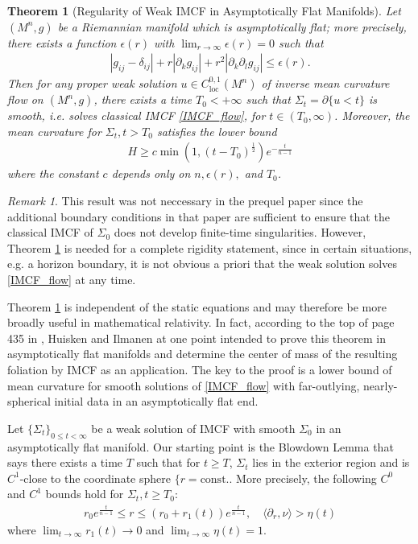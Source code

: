 \documentclass[12pt,twoside]{article}
\theoremstyle{plain}
\newtheorem{theorem}{Theorem}[section]
\theoremstyle{definition}
\theoremstyle{remark}
\newtheorem*{remark}{Remark}
\newcommand{\pl}{\partial}
\newcommand{\rw}{\rightarrow}
\numberwithin{equation}{section}
\begin{document}
\begin{theorem}[Regularity of Weak IMCF in Asymptotically Flat Manifolds] \label{imcf_smoothing}
Let $(M^{n},g)$ be a Riemannian manifold which is asymptotically flat; more precisely, there exists a function $\epsilon(r)$ with $\lim_{r\rw\infty} \epsilon(r) = 0$ such that
\begin{align}
|g_{ij} - \delta_{ij}| + r|\pl_k g_{ij}| + r^2 |\pl_k\pl_l g_{ij}| \le \epsilon(r). 
\end{align}
Then for any proper weak solution $u \in C^{0,1}_{\text{loc}} (M^{n})$ of inverse mean curvature flow on $(M^{n},g)$, there exists a time $T_0 < +\infty$ such that $\Sigma_{t}= \partial \{ u < t \}$ is smooth, i.e. solves classical IMCF \eqref{IMCF_flow}, for $t \in (T_{0},\infty)$. Moreover, the mean curvature for $\Sigma_t, t > T_0$ satisfies the lower bound
\begin{align}
H \ge c \min ( 1, (t - T_0)^{\frac{1}{2}} ) e^{-\frac{t}{n-1}}
\end{align}
where the constant $c$ depends only on $n,\epsilon(r),$ and $T_0$.
\end{theorem}
\begin{remark}
This result was not neccessary in the prequel paper \cite{HW} since the additional boundary conditions in that paper are sufficient to ensure that the classical IMCF of $\Sigma_{0}$ does not develop finite-time singularities. However, Theorem \ref{imcf_smoothing} is needed for a complete rigidity statement, since in certain situations, e.g. a horizon boundary, it is not obvious a priori that the weak solution solves \eqref{IMCF_flow} at any time.
\end{remark}

Theorem \ref{imcf_smoothing} is independent of the static equations and may therefore be more broadly useful in mathematical relativity. In fact, according to the top of page 435 in \cite{HI2}, Huisken and Ilmanen at one point intended to prove this theorem in asymptotically flat manifolds and determine the center of mass of the resulting foliation by IMCF as an application. The key to the proof is a lower bound of mean curvature for smooth solutions of \eqref{IMCF_flow} with far-outlying, nearly-spherical initial data in an asymptotically flat end.
 
Let $\{ \Sigma_t \}_{0 \le t < \infty}$ be a weak solution of IMCF with smooth $\Sigma_0$ in an asymptotically flat manifold. Our starting point is the Blowdown Lemma \cite[Blowdown Lemma 7.1, Equation (7.5)]{HI} that says there exists a time $T$ such that for $t \ge T$, $\Sigma_t $ lies in the exterior region and is $C^1$-close to the coordinate sphere $\{ r = \mbox{const.}$. More precisely, the following $C^0$ and $C^1$ bounds hold for $\Sigma_t, t \ge T_0$:
\begin{align}\label{C0C1bound}
r_0 e^{\frac{t}{n-1}} \le r \le (r_0 + r_1(t)) e^{\frac{t}{n-1}}, \quad \langle \pl_r ,\nu \rangle > \eta(t)
\end{align}
where $\lim_{t \rw \infty} r_1(t) \rw 0$ and $\lim_{t\rw\infty} \eta(t) = 1$.
\end{document}
